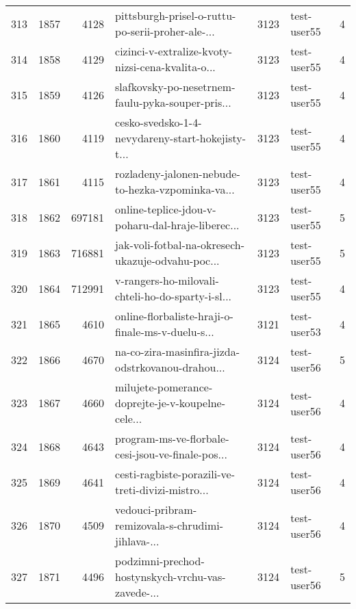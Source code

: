 \begin{tabular}{lrrlrlr}
313  &       1857 &     4128 &  pittsburgh-prisel-o-ruttu-po-serii-proher-ale-... &     3123 &                  test-user55 &               4 \\
314  &       1858 &     4129 &  cizinci-v-extralize-kvoty-nizsi-cena-kvalita-o... &     3123 &                  test-user55 &               4 \\
315  &       1859 &     4126 &  slafkovsky-po-nesetrnem-faulu-pyka-souper-pris... &     3123 &                  test-user55 &               4 \\
316  &       1860 &     4119 &  cesko-svedsko-1-4-nevydareny-start-hokejisty-t... &     3123 &                  test-user55 &               4 \\
317  &       1861 &     4115 &  rozladeny-jalonen-nebude-to-hezka-vzpominka-va... &     3123 &                  test-user55 &               4 \\
318  &       1862 &   697181 &  online-teplice-jdou-v-poharu-dal-hraje-liberec... &     3123 &                  test-user55 &               5 \\
319  &       1863 &   716881 &  jak-voli-fotbal-na-okresech-ukazuje-odvahu-poc... &     3123 &                  test-user55 &               5 \\
320  &       1864 &   712991 &  v-rangers-ho-milovali-chteli-ho-do-sparty-i-sl... &     3123 &                  test-user55 &               4 \\
321  &       1865 &     4610 &  online-florbaliste-hraji-o-finale-ms-v-duelu-s... &     3121 &                  test-user53 &               4 \\
322  &       1866 &     4670 &  na-co-zira-masinfira-jizda-odstrkovanou-drahou... &     3124 &                  test-user56 &               5 \\
323  &       1867 &     4660 &  milujete-pomerance-doprejte-je-v-koupelne-cele... &     3124 &                  test-user56 &               4 \\
324  &       1868 &     4643 &  program-ms-ve-florbale-cesi-jsou-ve-finale-pos... &     3124 &                  test-user56 &               4 \\
325  &       1869 &     4641 &  cesti-ragbiste-porazili-ve-treti-divizi-mistro... &     3124 &                  test-user56 &               4 \\
326  &       1870 &     4509 &  vedouci-pribram-remizovala-s-chrudimi-jihlava-... &     3124 &                  test-user56 &               4 \\
327  &       1871 &     4496 &  podzimni-prechod-hostynskych-vrchu-vas-zavede-... &     3124 &                  test-user56 &               5 \\

\end{tabular}
